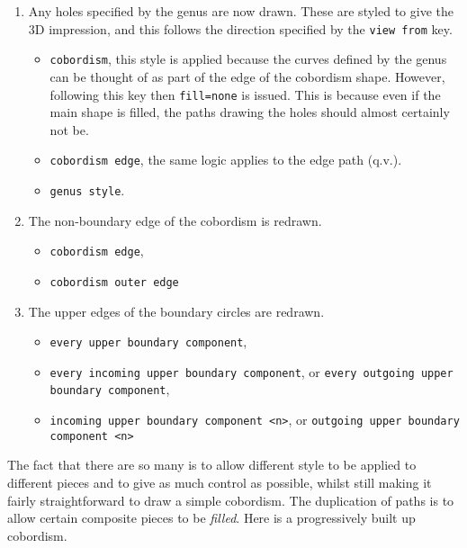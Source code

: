\documentclass{ltxdoc}
\begin{document}
\begin{enumerate}
\item Any holes specified by the genus are now drawn.
These are styled to give the 3D impression, and this follows the direction specified by the \Verb+view from+ key.

\begin{itemize}
\item \Verb+cobordism+, this style is applied because the curves defined by the genus can be thought of as part of the edge of the cobordism shape.
However, following this key then \Verb+fill=none+ is issued.
This is because even if the main shape is filled, the paths drawing the holes should almost certainly not be.
\item \Verb+cobordism edge+, the same logic applies to the edge path (q.v.).
\item \Verb+genus style+.
\end{itemize}

\item The non-boundary edge of the cobordism is redrawn.

\begin{itemize}
\item \Verb+cobordism edge+,
\item \Verb+cobordism outer edge+
\end{itemize}

\item The upper edges of the boundary circles are redrawn.

\begin{itemize}
\item \Verb+every upper boundary component+,
\item \Verb+every incoming upper boundary component+, or  \Verb+every outgoing upper boundary component+,
\item \Verb+incoming upper boundary component <n>+, or \Verb+outgoing upper boundary component <n>+
\end{itemize}
\end{enumerate}

The fact that there are so many is to allow different style to be applied to different pieces and to give as much control as possible, whilst still making it fairly straightforward to draw a simple cobordism.
The duplication of paths is to allow certain composite pieces to be \emph{filled}.
Here is a progressively built up cobordism.
\end{document}
